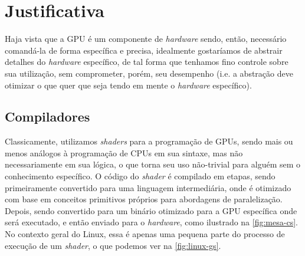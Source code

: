 \documentclass[10pt, a4paper, conference, onecolumn]{IEEEtran}
\begin{document}
\section{Justificativa}

Haja vista que a GPU é um componente de \textit{hardware} sendo, então,
necessário comandá-la de forma específica e precisa, idealmente gostaríamos de
abstrair detalhes do \textit{hardware} específico, de tal forma que tenhamos
fino controle sobre sua utilização, sem comprometer, porém, seu desempenho
(i.e. a abstração deve otimizar o que quer que seja tendo em mente o
\textit{hardware} específico).

\subsection{Compiladores} \label{sec:compiladores}

Classicamente, utilizamos \textit{shaders} para a programação de GPUs, sendo
mais ou menos análogos à programação de CPUs em sua sintaxe, mas não
necessariamente em sua lógica, o que torna seu uso não-trivial para alguém sem
o conhecimento específico. O código do \textit{shader} é compilado em
etapas, sendo primeiramente convertido para uma linguagem intermediária, onde é
otimizado com base em conceitos primitivos próprios para abordagens de
paralelização. Depois, sendo convertido para um binário otimizado para a GPU
específica onde será executado, e então enviado para o \textit{hardware}, como
ilustrado na \ref{fig:mesa-cs}.
No contexto geral do Linux, essa é apenas uma pequena parte do processo de
execução de um \textit{shader}, o que podemos ver na \ref{fig:linux-gs}.
\end{document}
